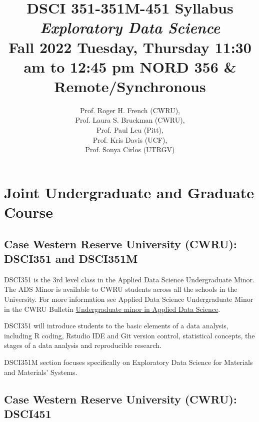\documentclass[10pt]{article} %
\title{DSCI 351-351M-451 Syllabus \\ \emph{Exploratory Data Science} \\ Fall 2022 	Tuesday, Thursday 11:30 am to 12:45 pm NORD 356 \& Remote/Synchronous}
\author{Prof. Roger H. French (CWRU), \\ Prof. Laura S. Bruckman (CWRU), \\ Prof. Paul Leu (Pitt), \\ Prof. Kris Davis (UCF), \\ Prof. Sonya Cirlos (UTRGV)}
\begin{document}
\maketitle



\tableofcontents


\section{Joint Undergraduate and Graduate Course}

  \subsection{Case Western Reserve University (CWRU): DSCI351 and DSCI351M}

    DSCI351 is the 3rd level class in the Applied Data Science Undergraduate Minor.
    The ADS Minor is available to CWRU students across all the schools in the University.
    For more information see Applied Data Science Undergraduate Minor in the CWRU Bulletin \href{https://bulletin.case.edu/engineering/materials-science-engineering/applied-data-science-minor/}{Undergraduate minor in Applied Data Science}.

    DSCI351 will introduce students to the basic elements of a data analysis, including R coding, Rstudio IDE and Git version control, statistical concepts, the stages of a data analysis and reproducible research.

    DSCI351M section focuses specifically on Exploratory Data Science for Materials and Materials' Systems.

  \subsection{Case Western Reserve University (CWRU): DSCI451}
\end{document}
